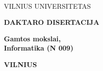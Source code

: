 \newpage
\thispagestyle{empty}                   %
{\selectfont
\linespread{1.15}\selectfont
\renewcommand\bfdefault{m}
\begin{flushright}
    \thesisDOI \\
    \thesisORCID
\end{flushright}

\begin{center}
	\vspace*{5mm}	
	\begin{flushleft}
         \fontsize{12}{12}\selectfont
	       VILNIUS UNIVERSITETAS \\
	\end{flushleft}
 
	\vspace{50mm}
	\begin{flushleft}
	   {\fontsize{15}{15}\selectfont  \thesisAuthorName \hspace{} \thesisAuthorSurname \par}
    \end{flushleft}

	\vspace{10mm}
	\begin{flushleft}
    	{ \fontsize{21}{21}\selectfont
    	   \thesisTitleLT \par
    	}
    \end{flushleft}

    \vspace{50mm minus 45mm}
    \begin{flushleft}
        \renewcommand\bfdefault{b}
        \fontsize{12}{12}\selectfont
        {\bf DAKTARO DISERTACIJA}\\ 
    \end{flushleft}
    
    \vspace{5mm}
    \begin{flushleft}
        \renewcommand\bfdefault{m}
        \fontsize{12}{12}\selectfont
        \bf
            Gamtos mokslai, \\ %
            Informatika (N 009)  %
    \end{flushleft}
    
    \vspace{6mm}
    \begin{flushleft} 
         \fontsize{9}{9}\selectfont
        \bf VILNIUS \thesisYear
    \end{flushleft} 
\end{center}
}

